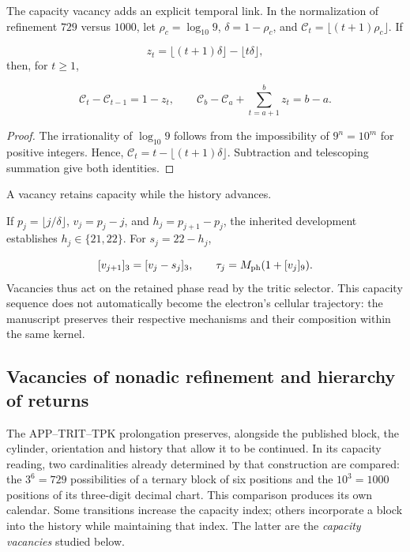 The capacity vacancy adds an explicit temporal link. In the normalization of refinement \(729\) versus \(1000\), let \(\rho_c=\log_{10}9\), \(\delta=1-\rho_c\), and \(\mathcal C_t=\lfloor(t+1)\rho_c\rfloor\). If

\[
z_t=\lfloor(t+1)\delta\rfloor-\lfloor t\delta\rfloor,
\]
then, for \(t\geq1\),

\[
\mathcal C_t-\mathcal C_{t-1}=1-z_t,
\qquad
\mathcal C_b-\mathcal C_a+\sum_{t=a+1}^b z_t=b-a.
\]
\begin{proof}
The irrationality of \(\log_{10}9\) follows from the impossibility of \(9^n=10^m\) for positive integers. Hence, \(\mathcal C_t=t-\lfloor(t+1)\delta\rfloor\). Subtraction and telescoping summation give both identities. \end{proof}
A vacancy retains capacity while the history advances.

If \(p_j=\lfloor j/\delta\rfloor\), \(v_j=p_j-j\), and \(h_j=p_{j+1}-p_j\), the inherited development establishes \(h_j\in\{21,22\}\). For \(s_j=22-h_j\),

\[
[v_{j+1}]_3=[v_j-s_j]_3,\qquad
\tau_j=M_{\rm ph}(1+[v_j]_9).
\]
Vacancies thus act on the retained phase read by the tritic selector. This capacity sequence does not automatically become the electron's cellular trajectory: the manuscript preserves their respective mechanisms and their composition within the same kernel.


\subsection{Vacancies of nonadic refinement and hierarchy of returns}
\label{viii:vac-add-seccion}

The APP--TRIT--TPK prolongation preserves, alongside the published block, the
cylinder, orientation and history that allow it to be continued. In its
capacity reading, two cardinalities already determined by that
construction are compared: the \(3^6=729\) possibilities of a ternary block of six
positions and the \(10^3=1000\) positions of its three-digit decimal
chart. This comparison produces its own calendar. Some
transitions increase the capacity index; others incorporate a block
into the history while maintaining that index. The latter are the
\emph{capacity vacancies} studied below.


